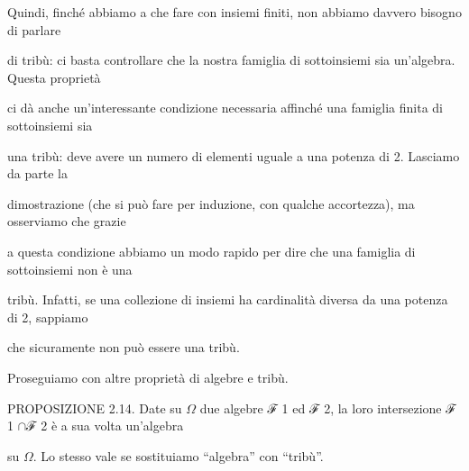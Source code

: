 \documentclass[a4paper,portrait,12pt]{article}
\begin{document}
\begin{flushleft}
Quindi, finch\'{e} abbiamo a che fare con insiemi finiti, non abbiamo davvero bisogno di parlare
\end{flushleft}


\begin{flushleft}
di tribù: ci basta controllare che la nostra famiglia di sottoinsiemi sia un'algebra. Questa propriet\`{a}
\end{flushleft}


\begin{flushleft}
ci d\`{a} anche un'interessante condizione necessaria affinch\'{e} una famiglia finita di sottoinsiemi sia
\end{flushleft}


\begin{flushleft}
una tribù: deve avere un numero di elementi uguale a una potenza di 2. Lasciamo da parte la
\end{flushleft}


\begin{flushleft}
dimostrazione (che si pu\`{o} fare per induzione, con qualche accortezza), ma osserviamo che grazie
\end{flushleft}


\begin{flushleft}
a questa condizione abbiamo un modo rapido per dire che una famiglia di sottoinsiemi non \`{e} una
\end{flushleft}


\begin{flushleft}
tribù. Infatti, se una collezione di insiemi ha cardinalit\`{a} diversa da una potenza di 2, sappiamo
\end{flushleft}


\begin{flushleft}
che sicuramente non pu\`{o} essere una tribù.
\end{flushleft}


\begin{flushleft}
Proseguiamo con altre propriet\`{a} di algebre e tribù.
\end{flushleft}


\begin{flushleft}
PROPOSIZIONE 2.14. Date su $\Omega$ due algebre ℱ 1 ed ℱ 2, la loro intersezione ℱ 1 $\cap$ℱ 2 \`{e} a sua volta un'algebra
\end{flushleft}


\begin{flushleft}
su $\Omega$. Lo stesso vale se sostituiamo ``algebra'' con ``tribù''.
\end{flushleft}
\end{document}
